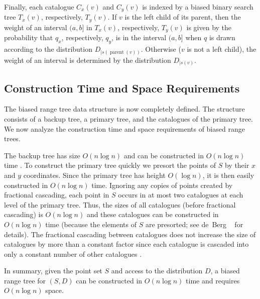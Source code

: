 \documentclass[charterfonts]{patmorin}
\DeclareMathOperator{\prnt}{parent}
\begin{document}

Finally, each catalogue $C_x(v)$ and $C_y(v)$ is indexed by a biased
binary search tree $T_x(v)$, respectively, $T_y(v)$.  If $v$ is the
left child of its parent, then the weight of an interval $(a,b]$ in
$T_x(v)$, respectively, $T_y(v)$ is given by the probability that
$q_x$, respectively, $q_y$, is in the interval $(a,b]$ when $q$ is
drawn according to the distribution $D_{\mid s(\prnt(v))}$.  Otherwise
($v$ is not a left child), the weight of an interval is determined by
the distribution $D_{\mid s(v)}$.

\subsection{Construction Time and Space Requirements}

The biased range tree data structure is now completely defined.  The
structure consists of a backup tree, a primary tree, and the
catalogues of the primary tree.  We now analyze the construction time
and space requirements of biased range trees.

The backup tree has size $O(n\log n)$ and can be constructed in
$O(n\log n)$ time \cite[Theorem~5.11]{bkos97}.  To construct the
primary tree quickly we presort the points of $S$ by their $x$ and $y$
coordinates.  Since the primary tree has height $O(\log n)$, it is
then easily constructed in $O(n\log n)$ time.  Ignoring any copies of
points created by fractional cascading, each point in $S$ occurs in at
most two catalogues at each level of the primary tree.  Thus, the sizes
of all catalogues (before fractional cascading) is $O(n\log n)$ and
these catalogues can be constructed in $O(n\log n)$ time (because the
elements of $S$ are presorted; see de~Berg \etal\
\cite[Section~5.3]{bkos97} for details).  The fractional cascading
between catalogues does not increase the size of catalogues by more
than a constant factor since each catalogue is cascaded into only a
constant number of other catalogues \cite{ae76}.

In summary, given the point set $S$ and access to the distribution
$D$, a biased range tree for $(S,D)$ can be constructed in $O(n\log
n)$ time and requires $O(n\log n)$ space.
\end{document}
